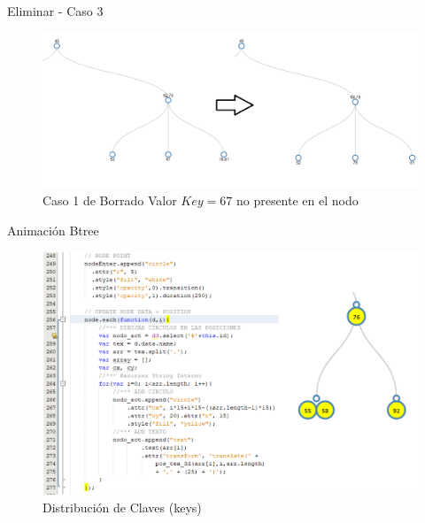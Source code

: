 \documentclass[11pt]{beamer}
\begin{document}
		\begin{frame}{Eliminar - Caso 3}
			\justifying
			\begin{figure}[H]
				\centering
				\includegraphics[scale=0.30]{img/btree_del_3.png}
				\caption{Caso 1 de Borrado Valor $Key=67$ no presente en el nodo \cite{CLRS2009}}
				\label{fig:btree_del_3}
			\end{figure}
		\end{frame}
		
		
		
		\begin{frame}{Animación Btree}
			\justifying
			\begin{figure}[H]
				\centering
				\includegraphics[scale=0.40]{img/btree_ani_1.PNG}
				\caption{Distribución de Claves (keys)}
				\label{fig:btree_ani_1}
			\end{figure}
		\end{frame}
		
\end{document}
